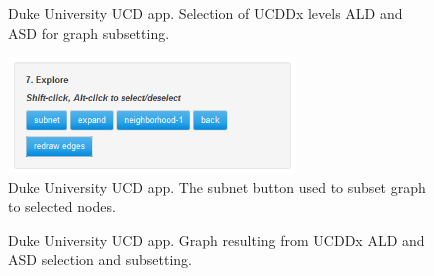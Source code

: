 \documentclass[10pt, letterpaper]{article}
\begin{document}
\begin{spacing}{1.0}
\begin{figure}[H]
    \centering
    \caption{Duke University UCD app.  Selection of UCDDx levels ALD and ASD for graph subsetting.}
    \label{fg:UCD04}
\end{figure}

\begin{figure}[H]
    \includegraphics[width=3in]{UCD05.png}
    \centering
    \caption{Duke University UCD app.  The subnet button used to subset graph to selected nodes.}
    \label{fg:UCD05}
\end{figure}

\begin{figure}[H]
    \centering
    \caption{Duke University UCD app.  Graph resulting from UCDDx ALD and ASD selection and subsetting.}
    \label{fg:UCD06}
\end{figure}


\end{spacing}
\end{document}
